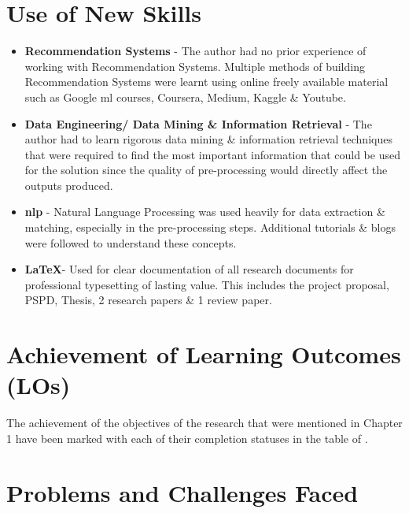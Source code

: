 \section{Use of New Skills}
\begin{itemize}
\item \textbf{Recommendation Systems} - The author had no prior experience of working with Recommendation Systems. Multiple methods of building Recommendation Systems were learnt using online freely available  material such as Google \gls{ml} courses, Coursera, Medium, Kaggle \& Youtube.
\item \textbf{Data Engineering/ Data Mining \& Information Retrieval} - The author had to learn rigorous data mining \& information retrieval techniques that were required to find the most important information that could be used for the solution since the quality of pre-processing would directly affect the outputs produced.
\item \textbf{\gls{nlp}} - Natural Language Processing was used heavily for data extraction \& matching, especially in the pre-processing steps. Additional tutorials \& blogs were followed to understand these concepts.
\item \textbf{\LaTeX }- Used for clear documentation of all research documents for professional typesetting of lasting value. This includes the project proposal, PSPD, Thesis, 2 research papers \& 1 review paper.
\end{itemize}

\section{Achievement of Learning Outcomes (LOs)}
The achievement of the objectives of the research that were mentioned in Chapter 1 have been marked with each of their completion statuses in the  table of \textit{}.


\section{Problems and Challenges Faced}

